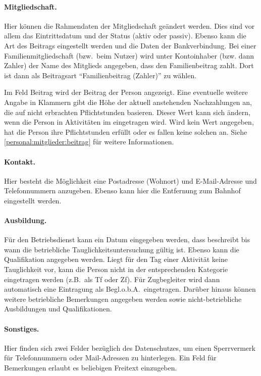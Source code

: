 \paragraph{Mitgliedschaft.}
Hier können die Rahmendaten der Mitgliedschaft geändert werden.
Dies sind vor allem das Eintrittsdatum und der Status (aktiv oder passiv).
Ebenso kann die Art des Beitrags eingestellt werden
und die Daten der Bankverbindung.
Bei einer Familienmitgliedschaft (bzw.\ beim Nutzer) wird unter Kontoinhaber (bzw. dann Zahler)
der Name des Mitglieds angegeben, dass den Familienbeitrag zahlt.
Dort ist dann als Beitragsart "`Familienbeitrag (Zahler)"' zu wählen.
\begin{neu}
Im Feld Beitrag wird der Beitrag der Person angezeigt.
Eine eventuelle weitere Angabe in Klammern gibt die Höhe der aktuell anstehenden Nachzahlungen an,
die auf nicht erbrachten Pflichtstunden basieren.
Dieser Wert kann sich ändern, wenn die Person in Aktivitäten im \Einsatz eingetragen wird.
Wird kein Wert angegeben, hat die Person ihre Pflichtstunden erfüllt
oder es fallen keine solchen an.
Siehe \cref{personal:mitglieder:beitrag} für weitere Informationen.
\end{neu}

\paragraph{Kontakt.}
Hier besteht die Möglichkeit eine Postadresse (Wohnort)
und E-Mail-Adresse und Telefonnummern anzugeben.
Ebenso kann hier die Entfernung zum Bahnhof eingestellt werden.

\paragraph{Ausbildung.}
Für den Betriebsdienst kann ein Datum eingegeben werden, dass beschreibt bis wann die betriebliche Tauglichkeitsuntersuchung gültig ist.
Ebenso kann die Qualifikation angegeben werden.
Liegt für den Tag einer Aktivität keine Tauglichkeit vor,
kann die Person nicht in der entsprechenden Kategorie eingetragen werden
(z.B.\ als Tf oder Zf).
Für Zugbegleiter wird dann automatisch eine Eintragung als Begl.o.b.A.\ eingetragen.
Darüber hinaus können weitere betriebliche Bemerkungen angegeben werden
sowie nicht-betriebliche Ausbildungen und Qualifikationen.

\paragraph{Sonstiges.}
Hier finden sich zwei Felder bezüglich des Datenschutzes,
um einen Sperrvermerk für Telefonnummern oder Mail-Adressen zu hinterlegen.
Ein Feld für Bemerkungen erlaubt es beliebigen Freitext einzugeben.



